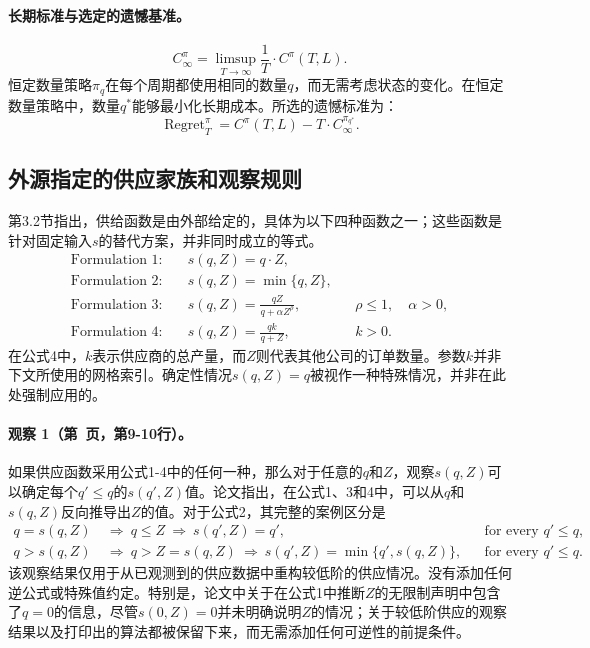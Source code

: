 \documentclass{article}
\begin{document}
\paragraph{长期标准与选定的遗憾基准。}
\begin{equation}
C_\infty^\pi=\limsup_{T\to\infty}\frac{1}{T}\cdot C^\pi(T,L).\tag{2}
\end{equation}
恒定数量策略\(\pi_q\)在每个周期都使用相同的数量\(q\)，而无需考虑状态的变化。在恒定数量策略中，数量\(q^*\)能够最小化长期成本。所选的遗憾标准为：
\begin{equation}
\operatorname{Regret}_T^\pi
=C^\pi(T,L)-T\cdot C_\infty^{\pi_{q^*}}.\tag{3}
\end{equation}

\subsection*{外源指定的供应家族和观察规则}
第3.2节指出，供给函数是由外部给定的，具体为以下四种函数之一；这些函数是针对固定输入\(s\)的替代方案，并非同时成立的等式。
\begin{align*}
\text{Formulation 1:}\quad&s(q,Z)=q\cdot Z,\\
\text{Formulation 2:}\quad&s(q,Z)=\min\{q,Z\},\\
\text{Formulation 3:}\quad&s(q,Z)=\frac{qZ}{q+\alpha Z^\rho},
&&\rho\leq1,\quad\alpha>0,\\
\text{Formulation 4:}\quad&s(q,Z)=\frac{qk}{q+Z},
&&k>0.
\end{align*}
在公式4中，\(k\)表示供应商的总产量，而\(Z\)则代表其他公司的订单数量。参数\(k\)并非下文所使用的网格索引。确定性情况\(s(q,Z)=q\)被视作一种特殊情况，并非在此处强制应用的。

\paragraph{观察 1（第\ 页，第9-10行）。}
如果供应函数采用公式1-4中的任何一种，那么对于任意的\(q\)和\(Z\)，观察\(s(q,Z)\)可以确定每个\(q'\leq q\)的\(s(q',Z)\)值。论文指出，在公式1、3和4中，可以从\(q\)和\(s(q,Z)\)反向推导出\(Z\)的值。对于公式2，其完整的案例区分是
\begin{align*}
q=s(q,Z)&\ \Longrightarrow\ q\leq Z
\ \Longrightarrow\ s(q',Z)=q',&&\text{for every }q'\leq q,\\
q>s(q,Z)&\ \Longrightarrow\ q>Z=s(q,Z)
\ \Longrightarrow\ s(q',Z)=\min\{q',s(q,Z)\},
&&\text{for every }q'\leq q.
\end{align*}
该观察结果仅用于从已观测到的供应数据中重构较低阶的供应情况。没有添加任何逆公式或特殊值约定。特别是，论文中关于在公式1中推断\(Z\)的无限制声明中包含了\(q=0\)的信息，尽管\(s(0,Z)=0\)并未明确说明\(Z\)的情况；关于较低阶供应的观察结果以及打印出的算法都被保留下来，而无需添加任何可逆性的前提条件。
\end{document}
